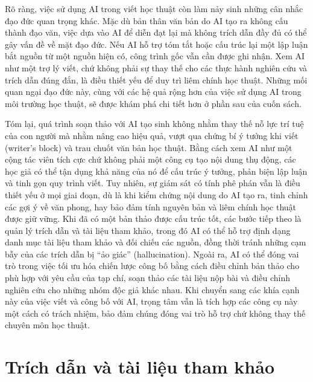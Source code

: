 Rõ ràng, việc sử dụng AI trong viết học thuật còn làm nảy sinh những cân nhắc đạo đức quan trọng khác. Mặc dù bản thân văn bản do AI tạo ra không cấu thành đạo văn, việc dựa vào AI để diễn đạt lại mà không trích dẫn đầy đủ có thể gây vấn đề về mặt đạo đức. Nếu AI hỗ trợ tóm tắt hoặc cấu trúc lại một lập luận bắt nguồn từ một nguồn hiện có, công trình gốc vẫn cần được ghi nhận. Xem AI như một trợ lý viết, chứ không phải sự thay thế cho các thực hành nghiên cứu và trích dẫn đúng đắn, là điều thiết yếu để duy trì liêm chính học thuật. Những mối quan ngại đạo đức này, cùng với các hệ quả rộng hơn của việc sử dụng AI trong môi trường học thuật, sẽ được khám phá chi tiết hơn ở phần sau của cuốn sách.

Tóm lại, quá trình soạn thảo với AI tạo sinh không nhằm thay thế nỗ lực trí tuệ của con người mà nhằm nâng cao hiệu quả, vượt qua chứng bí ý tưởng khi viết (writer's block) và trau chuốt văn bản học thuật. Bằng cách xem AI như một cộng tác viên tích cực chứ không phải một công cụ tạo nội dung thụ động, các học giả có thể tận dụng khả năng của nó để cấu trúc ý tưởng, phản biện lập luận và tinh gọn quy trình viết. Tuy nhiên, sự giám sát có tính phê phán vẫn là điều thiết yếu ở mọi giai đoạn, dù là khi kiểm chứng nội dung do AI tạo ra, tinh chỉnh các gợi ý về văn phong, hay bảo đảm tính nguyên bản và liêm chính học thuật được giữ vững. Khi đã có một bản thảo được cấu trúc tốt, các bước tiếp theo là quản lý trích dẫn và tài liệu tham khảo, trong đó AI có thể hỗ trợ định dạng danh mục tài liệu tham khảo và đối chiếu các nguồn, đồng thời tránh những cạm bẫy của các trích dẫn bị ``ảo giác'' (hallucination). Ngoài ra, AI có thể đóng vai trò trong việc tối ưu hóa chiến lược công bố bằng cách điều chỉnh bản thảo cho phù hợp với yêu cầu của tạp chí, soạn thảo các tài liệu nộp bài và điều chỉnh nghiên cứu cho những nhóm độc giả khác nhau. Khi chuyển sang các khía cạnh này của việc viết và công bố với AI, trọng tâm vẫn là tích hợp các công cụ này một cách có trách nhiệm, bảo đảm chúng đóng vai trò hỗ trợ chứ không thay thế chuyên môn học thuật.

\section{Trích dẫn và tài liệu tham khảo}

